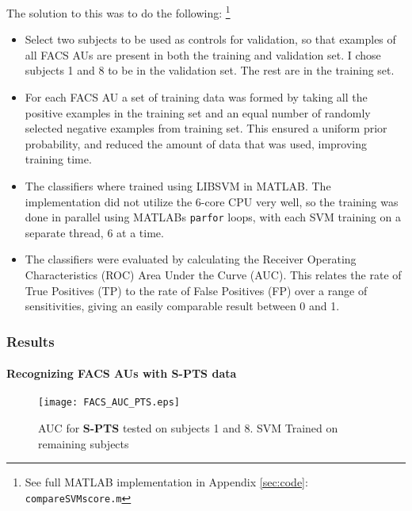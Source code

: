 \documentclass[Main]{subfiles}
\begin{document}
			The solution to this was to do the following:
			\footnote{See full MATLAB implementation in Appendix \ref{sec:code}: \texttt{compareSVMscore.m}}
			\begin{itemize}
				\item
				Select two subjects to be used as controls for validation, so that examples of all FACS AUs are present in both the training and validation set.
				I chose subjects 1 and 8 to be in the validation set.
				The rest are in the training set.

				\item
				For each FACS AU a set of training data was formed by taking all the positive examples in the training set and an equal number of randomly selected negative examples from training set.
				This ensured a uniform prior probability, and reduced the amount of data that was used, improving training time.

				\item
				The classifiers where trained using LIBSVM \cite{CC01a} in MATLAB.
				The implementation did not utilize the 6-core CPU very well, so the training was done in parallel using MATLABs \texttt{parfor} loops, with each SVM training on a separate thread, 6 at a time.

				\item
				The classifiers were evaluated by calculating the Receiver Operating Characteristics (ROC) Area Under the Curve (AUC).
				This relates the rate of True Positives (TP) to the rate of False Positives (FP) over a range of sensitivities, giving an easily comparable result between 0 and 1.

			\end{itemize}


		\subsubsection{Results} %
			\label{ssub:results_ex1}

			\paragraph{Recognizing FACS AUs with \textbf{S-PTS} data} %
				\label{par:recognizing_facs_aus_with_s-pts}
				\begin{figure}[H]
					\begin{center}
						\texttt{[image: FACS\_AUC\_PTS.eps]}
					\end{center}
					\caption{
						AUC for \textbf{S-PTS} tested on subjects 1 and 8.
						SVM Trained on remaining subjects
						}
					\label{fig:spts_auc}
				\end{figure}
				
\end{document}
